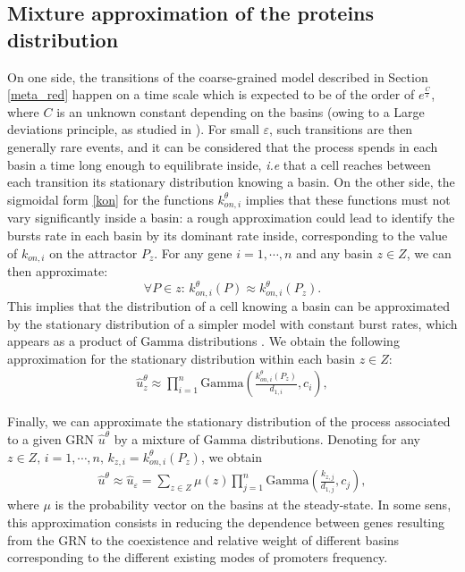 \subsection{Mixture approximation of the proteins distribution}

On one side, the transitions of the coarse-grained model described in Section \ref{meta_red} happen on a time scale which is expected to be of the order of $e^{\frac{C}{\varepsilon}}$, where $C$ is an unknown constant depending on the basins (owing to a Large deviations principle, as studied in \cite{ventre2020reduction}). For small $\varepsilon$, such transitions are then generally rare events, and it can be considered that the process spends in each basin a time long enough to equilibrate inside, \textit{i.e} that a cell reaches between each transition its stationary distribution knowing a basin. On the other side, the sigmoidal form \eqref{kon} for the functions $k_{on,i}^\theta$ implies that these functions must not vary significantly inside a basin: a rough approximation could lead to identify the bursts rate in each basin by its dominant rate inside, corresponding to the value of $k_{\mathit{on,i}}$ on the attractor $P_z$. For any gene $i=1,\cdots,n$ and any basin $z \in Z$, we can then approximate: 
$$\forall P \in z:\,k_{\mathit{on},i}^\theta(P) \approx k_{\mathit{on},i}^\theta(P_z).$$
This implies that the distribution of a cell knowing a basin can be approximated by the stationary distribution of a simpler model with constant burst rates, which appears as a product of $\textrm{Gamma}$ distributions \cite{mackey2011molecular}. We obtain the following approximation for the stationary distribution within each basin $z \in Z$: 
\begin{align*}
    \hat{u}_{z}^\theta \approx \prod\limits_{i=1}^n\textrm{Gamma}\left(\frac{k_{\mathit{on},i}^\theta(P_z)}{d_{1,i}},c_i\right),
\end{align*}

Finally, we can approximate the stationary distribution of the process associated to a given GRN $\hat{u}^\theta$ by a mixture of $\textrm{Gamma}$ distributions. Denoting for any $z \in Z,\, i=1,\cdots,n,\, k_{z, i} = k_{\mathit{on},i}^\theta(P_z)$, we obtain
\begin{align}
    \hat{u}^\theta \approx \hat{u}_\varepsilon = \sum\limits_{z \in Z}\mu(z)\prod\limits_{j=1}^n\textrm{Gamma}\left(\frac{k_{z, j}}{d_{1,j}},c_j\right),
    \label{dist:mixture}
\end{align}
where $\mu$ is the probability vector on the basins at the steady-state. In some sens, this approximation consists in reducing the dependence between genes resulting from the GRN to the coexistence and relative weight of different basins corresponding to the different existing modes of promoters frequency.\\

